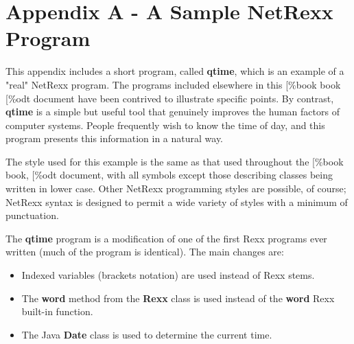 \chapter{Appendix A - A Sample NetRexx Program}\label{refappa}
 
This appendix includes a short program, called \textbf{qtime}, which
is an example of a "real" NetRexx program.  The programs included
elsewhere in this
[\%book
book
[\%odt
document
have been contrived to illustrate specific
points.  By contrast, \textbf{qtime} is a simple but useful tool that
genuinely improves the human factors of computer systems.  People
frequently wish to know the time of day, and this program presents this
information in a natural way.
 
The style used for this example is the same as that used throughout
the
[\%book
book,
[\%odt
document,
with all symbols except those describing classes being written
in lower case.  Other NetRexx programming styles are possible, of
course; NetRexx syntax is designed to permit a wide variety of styles
with a minimum of punctuation.
 
The \textbf{qtime} program is a modification of one of the first Rexx
programs ever written (much of the program is identical).  The main
changes are:
\begin{itemize}
\item Indexed variables (brackets notation) are used instead of Rexx
stems.
\item The \textbf{word} method from the \textbf{Rexx} class is used
instead of the \textbf{word} Rexx built-in function.
\item The Java \textbf{Date} class is used to determine the current
time.
\end{itemize}
 
